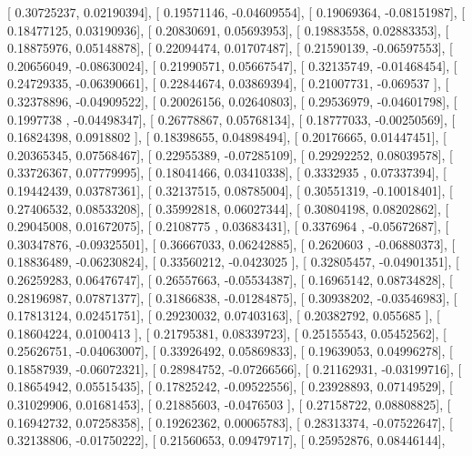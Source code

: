 \documentclass{article}
\begin{document}
       [ 0.30725237,  0.02190394],
       [ 0.19571146, -0.04609554],
       [ 0.19069364, -0.08151987],
       [ 0.18477125,  0.03190936],
       [ 0.20830691,  0.05693953],
       [ 0.19883558,  0.02883353],
       [ 0.18875976,  0.05148878],
       [ 0.22094474,  0.01707487],
       [ 0.21590139, -0.06597553],
       [ 0.20656049, -0.08630024],
       [ 0.21990571,  0.05667547],
       [ 0.32135749, -0.01468454],
       [ 0.24729335, -0.06390661],
       [ 0.22844674,  0.03869394],
       [ 0.21007731, -0.069537  ],
       [ 0.32378896, -0.04909522],
       [ 0.20026156,  0.02640803],
       [ 0.29536979, -0.04601798],
       [ 0.1997738 , -0.04498347],
       [ 0.26778867,  0.05768134],
       [ 0.18777033, -0.00250569],
       [ 0.16824398,  0.0918802 ],
       [ 0.18398655,  0.04898494],
       [ 0.20176665,  0.01447451],
       [ 0.20365345,  0.07568467],
       [ 0.22955389, -0.07285109],
       [ 0.29292252,  0.08039578],
       [ 0.33726367,  0.07779995],
       [ 0.18041466,  0.03410338],
       [ 0.3332935 ,  0.07337394],
       [ 0.19442439,  0.03787361],
       [ 0.32137515,  0.08785004],
       [ 0.30551319, -0.10018401],
       [ 0.27406532,  0.08533208],
       [ 0.35992818,  0.06027344],
       [ 0.30804198,  0.08202862],
       [ 0.29045008,  0.01672075],
       [ 0.2108775 ,  0.03683431],
       [ 0.3376964 , -0.05672687],
       [ 0.30347876, -0.09325501],
       [ 0.36667033,  0.06242885],
       [ 0.2620603 , -0.06880373],
       [ 0.18836489, -0.06230824],
       [ 0.33560212, -0.0423025 ],
       [ 0.32805457, -0.04901351],
       [ 0.26259283,  0.06476747],
       [ 0.26557663, -0.05534387],
       [ 0.16965142,  0.08734828],
       [ 0.28196987,  0.07871377],
       [ 0.31866838, -0.01284875],
       [ 0.30938202, -0.03546983],
       [ 0.17813124,  0.02451751],
       [ 0.29230032,  0.07403163],
       [ 0.20382792,  0.055685  ],
       [ 0.18604224,  0.0100413 ],
       [ 0.21795381,  0.08339723],
       [ 0.25155543,  0.05452562],
       [ 0.25626751, -0.04063007],
       [ 0.33926492,  0.05869833],
       [ 0.19639053,  0.04996278],
       [ 0.18587939, -0.06072321],
       [ 0.28984752, -0.07266566],
       [ 0.21162931, -0.03199716],
       [ 0.18654942,  0.05515435],
       [ 0.17825242, -0.09522556],
       [ 0.23928893,  0.07149529],
       [ 0.31029906,  0.01681453],
       [ 0.21885603, -0.0476503 ],
       [ 0.27158722,  0.08808825],
       [ 0.16942732,  0.07258358],
       [ 0.19262362,  0.00065783],
       [ 0.28313374, -0.07522647],
       [ 0.32138806, -0.01750222],
       [ 0.21560653,  0.09479717],
       [ 0.25952876,  0.08446144],
\end{document}
